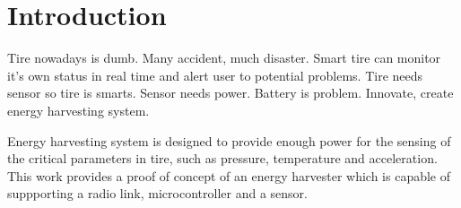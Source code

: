 \section{Introduction}

\thispagestyle{empty}

Tire nowadays is dumb. Many accident, much disaster. Smart tire can monitor it's own status in real time and alert user to potential problems.
Tire needs sensor so tire is smarts. Sensor needs power. Battery is problem. Innovate, create energy harvesting system. 

Energy harvesting system is designed to provide enough power for the sensing of the critical parameters in tire, such as pressure, temperature and acceleration. This work provides a proof of concept of an energy harvester which is capable of suppporting a radio link, microcontroller and a sensor. 


